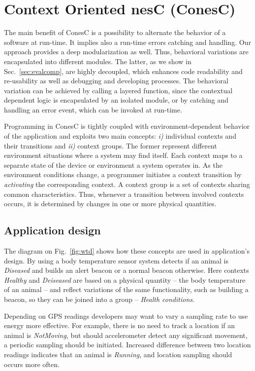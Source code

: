 
\section{Context Oriented nesC (ConesC)} 

The main benefit of ConesC is a possibility to alternate the behavior of a software at
run-time. It implies also a run-time errors catching and handling. Our approach
provides a deep modularization as well. Thus, behavioral variations are encapsulated
into different modules. The latter, as we show in Sec.~\ref{sec:evalcomp},
are highly decoupled, which enhances code readability and re-usability as well as debugging
and developing processes. The behavioral variation can be achieved by calling a
layered function, since the contextual dependent logic is encapsulated by an isolated module, or
by catching and handling an error event, which can be invoked at run-time.

Programming in ConesC is tightly coupled with environment-dependent behavior of
the application and exploits two main concepts: \emph{i)} individual contexts
and their transitions and \emph{ii)} context groups. The former represent
different environment situations where a system may find itself. Each context
maps to a separate state of the device or environment a system operates in. As
the environment conditions change, a programmer initiates a context transition
by \emph{activating} the corresponding context. A context group is a set of contexts
sharing common characteristics. Thus, whenever a transition between involved
contexts occurs, it is determined by changes in one or more physical quantities.

\subsection{Application design}

The diagram on Fig.~\ref{fig:wtd} shows how these concepts are used in application's design.
By using a body temperature sensor system detects if an animal is \emph{Diseased}
and builds an alert beacon or a normal beacon otherwise. Here contexts \emph{Healthy}
and \emph{Deiseased} are based on a physical quantity -- the body temperature of
an animal -- and reflect variations of the same functionality, such as building a beacon,
so they can be joined into a group -- \emph{Health conditions}.

Depending on GPS readings developers may want to vary a sampling rate to use energy
more effective. For example, there is no need to track a location if an animal
is \emph{NotMoving}, but should accelerometer detect any
significant movement, a periodic sampling should be initiated. Increased
difference between two location readings indicates that an animal is
\emph{Running}, and location sampling should occurs more often.


